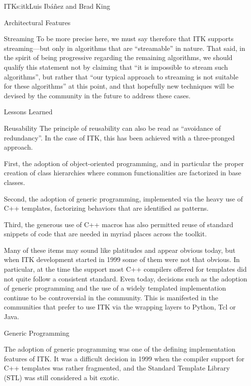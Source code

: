 \begin{aosachapter}{ITK}{s:itk}{Luis Ib\'{a}\~{n}ez and Brad King}
\begin{aosasect1}{Architectural Features}
\begin{aosasect2}{Streaming}
To be more precise here, we must say therefore that ITK supports
streaming---but only in algorithms that are ``streamable'' in
nature. That said, in the spirit of being progressive regarding the remaining
algorithms, we should qualify this statement not by claiming that ``it is
impossible to stream such algorithms'', but rather that ``our typical
approach to streaming is not suitable for these algorithms'' at this point, and
that hopefully new techniques will be devised by the community in the future to
address these cases.
\end{aosasect2}

\end{aosasect1}

\begin{aosasect1}{Lessons Learned}

\begin{aosasect2}{Reusability}
The principle of reusability can also be read as ``avoidance of redundancy''.
In the case of ITK, this has been achieved with a three-pronged approach.

\begin{aosaitemize}
\item First, the adoption of object-oriented programming, and in particular the
proper creation of class hierarchies where common functionalities are
factorized in base classes.
\item Second, the adoption of generic programming, implemented via the heavy
use of C++ templates, factorizing behaviors that are identified as patterns.
\item Third, the generous use of C++ macros has also permitted reuse of standard
snippets of code that are needed in myriad places across the toolkit.
\end{aosaitemize}

Many of these items may sound like platitudes and appear obvious 
today, but when ITK development started in 1999 some of them were not that
obvious. In particular, at the time the support most C++ compilers offered
for templates did not quite follow a consistent standard. Even today,
decisions such as the adoption of generic programming and the use of a widely
templated implementation continue to be controversial in the community. This is
manifested in the communities that prefer to use ITK via the wrapping layers to
Python, Tcl or Java.


\begin{aosasect3}{Generic Programming}

The adoption of generic programming was one of the defining implementation
features of ITK. It was a difficult decision in 1999 when the 
compiler support for C++ templates was rather fragmented, and the Standard Template
Library (STL) was still considered a bit exotic.


\end{aosasect3}
\end{aosasect2}
\end{aosasect1}
\end{aosachapter}
